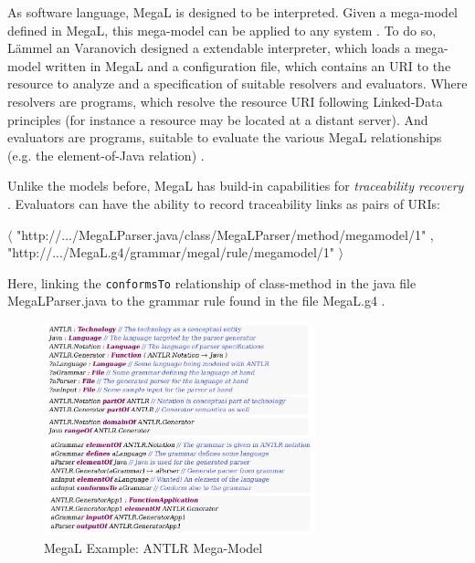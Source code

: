 \documentclass[runningheads,a4paper]{llncs}
\begin{document}
As software language, MegaL is designed to be interpreted.
Given a mega-model defined in MegaL, this mega-model can be applied to any system \cite{MEGAL2}.
To do so, Lämmel an Varanovich designed a extendable interpreter, which loads a mega-model written in MegaL and a configuration file, which contains an URI to the resource to analyze and a specification of suitable resolvers and evaluators.
Where resolvers are programs, which resolve the resource URI following Linked-Data principles (for instance a resource may be located at a distant server).
And evaluators are programs, suitable to evaluate the various MegaL relationships (e.g. the element-of-Java relation) \cite{MEGAL2}.

Unlike the models before, MegaL has build-in capabilities for \textit{traceability recovery} \cite{MEGAL2}.
Evaluators can have the ability to record traceability links as pairs of URIs:
\begin{center}
$\langle$ "http://.../MegaLParser.java/class/MegaLParser/method/megamodel/1" ,
\\"http://.../MegaL.g4/grammar/megal/rule/megamodel/1" $\rangle$
\end{center}
Here, linking the \texttt{conformsTo} relationship of class-method in the java file MegaLParser.java to the grammar rule found in the file MegaL.g4 \cite{MEGAL2}.

\begin{figure}
\centering
\includegraphics[width=0.7\textwidth]{megal-example-antlr.png}
\caption{MegaL Example: ANTLR Mega-Model\cite{MEGAL2}}
\label{fig:MegaL-Example}
\end{figure}
\end{document}
